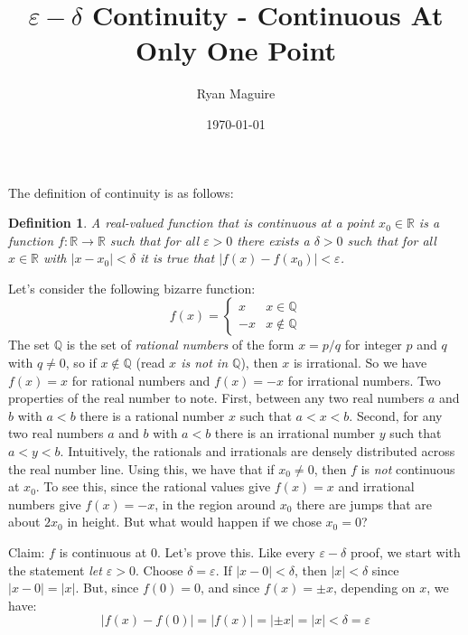 \documentclass{article}
\title{$\varepsilon-\delta$ Continuity - Continuous At Only One Point}
\author{Ryan Maguire}
\date{\today}
\theoremstyle{normal}
\newtheorem{definition}{Definition}
\begin{document}
    \maketitle
    The definition of continuity is as follows:
    \begin{definition}
        A real-valued function that is continuous at a point
        $x_{0}\in\mathbb{R}$ is a function $f:\mathbb{R}\rightarrow\mathbb{R}$
        such that for all $\varepsilon>0$ there exists a $\delta>0$ such that
        for all $x\in\mathbb{R}$ with $|x-x_{0}|<\delta$ it is true that
        $|f(x)-f(x_{0})|<\varepsilon$.
    \end{definition}
    Let's consider the following bizarre function:
    \begin{equation}
        f(x)=
        \begin{cases}
            x&x\in\mathbb{Q}\\
            -x&x\notin\mathbb{Q}
        \end{cases}
    \end{equation}
    The set $\mathbb{Q}$ is the set of \textit{rational numbers} of the
    form $x=p/q$ for integer $p$ and $q$ with $q\ne{0}$, so if
    $x\notin\mathbb{Q}$ (read \textit{$x$ is not in $\mathbb{Q}$}), then
    $x$ is irrational. So we have $f(x)=x$ for rational numbers and
    $f(x)=-x$ for irrational numbers. Two properties of the real number to
    note. First, between any two real numbers $a$ and $b$ with $a<b$ there is a
    rational number $x$ such that $a<x<b$. Second, for any two real numbers
    $a$ and $b$ with $a<b$ there is an irrational number $y$ such that $a<y<b$.
    Intuitively, the rationals and irrationals are densely distributed across
    the real number line. Using this, we have that if $x_{0}\ne{0}$, then
    $f$ is \textit{not} continuous at $x_{0}$. To see this, since the rational
    values give $f(x)=x$ and irrational numbers give $f(x)=-x$, in the region
    around $x_{0}$ there are jumps that are about $2x_{0}$ in height. But what
    would happen if we chose $x_{0}=0$?
    \par\hfill\par
    Claim: $f$ is continuous at $0$. Let's prove this. Like every
    $\varepsilon-\delta$ proof, we start with the statement
    \textit{let $\varepsilon>0$}. Choose $\delta=\varepsilon$. If
    $|x-0|<\delta$, then $|x|<\delta$ since $|x-0|=|x|$. But, since $f(0)=0$,
    and since $f(x)=\pm{x}$, depending on $x$, we have:
    \begin{equation}
        |f(x)-f(0)|=|f(x)|=|\pm{x}|=|x|<\delta=\varepsilon
    \end{equation}
\end{document}
